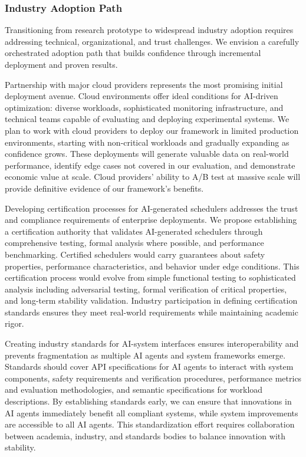 \subsubsection{Industry Adoption Path}
Transitioning from research prototype to widespread industry adoption requires addressing technical, organizational, and trust challenges. We envision a carefully orchestrated adoption path that builds confidence through incremental deployment and proven results.

Partnership with major cloud providers represents the most promising initial deployment avenue. Cloud environments offer ideal conditions for AI-driven optimization: diverse workloads, sophisticated monitoring infrastructure, and technical teams capable of evaluating and deploying experimental systems. We plan to work with cloud providers to deploy our framework in limited production environments, starting with non-critical workloads and gradually expanding as confidence grows. These deployments will generate valuable data on real-world performance, identify edge cases not covered in our evaluation, and demonstrate economic value at scale. Cloud providers' ability to A/B test at massive scale will provide definitive evidence of our framework's benefits.

Developing certification processes for AI-generated schedulers addresses the trust and compliance requirements of enterprise deployments. We propose establishing a certification authority that validates AI-generated schedulers through comprehensive testing, formal analysis where possible, and performance benchmarking. Certified schedulers would carry guarantees about safety properties, performance characteristics, and behavior under edge conditions. This certification process would evolve from simple functional testing to sophisticated analysis including adversarial testing, formal verification of critical properties, and long-term stability validation. Industry participation in defining certification standards ensures they meet real-world requirements while maintaining academic rigor.

Creating industry standards for AI-system interfaces ensures interoperability and prevents fragmentation as multiple AI agents and system frameworks emerge. Standards should cover API specifications for AI agents to interact with system components, safety requirements and verification procedures, performance metrics and evaluation methodologies, and semantic specifications for workload descriptions. By establishing standards early, we can ensure that innovations in AI agents immediately benefit all compliant systems, while system improvements are accessible to all AI agents. This standardization effort requires collaboration between academia, industry, and standards bodies to balance innovation with stability.


